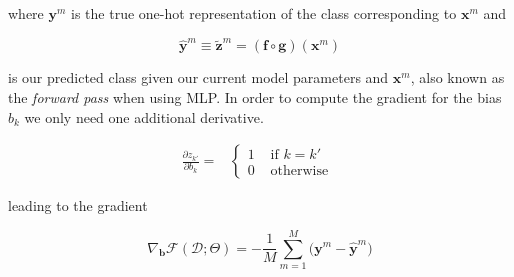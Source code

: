 \noindent where $\mathbf{y}^m$ is the true one-hot representation of the class
corresponding to $\mathbf{x}^m$ and 

\begin{equation}
\hat{\mathbf{y}}^m \equiv \tilde{\mathbf{z}}^m =  (\mathbf{f} \circ \mathbf{g})(\mathbf{x}^m)
\label{eq:forwardPass}
\end{equation}

\noindent is our predicted class given our current model parameters and
$\mathbf{x}^m$, also known as the \textit{forward pass} when using MLP. In
order to compute the gradient for the bias $b_{k}$  we only need one additional
derivative.

\begin{align}
\frac{\partial z_{k'}}{\partial b_{k}} = 
  &\begin{cases}
      1  &  \mbox{ if } k = k'\\ 
      0  &  \mbox{ otherwise } 
  \end{cases} 
  \label{eqn:eqsilonq}
\end{align}
	
\noindent leading to the gradient

\begin{equation}
\nabla_\mathbf{b}\mathcal{F}(\mathcal{D};\Theta) = -\frac{1}{M}\sum_{m=1}^M \Big(\mathbf{y}^m - \hat{\mathbf{y}}^m \Big)   
\label{eq:gradBias}
\end{equation}

